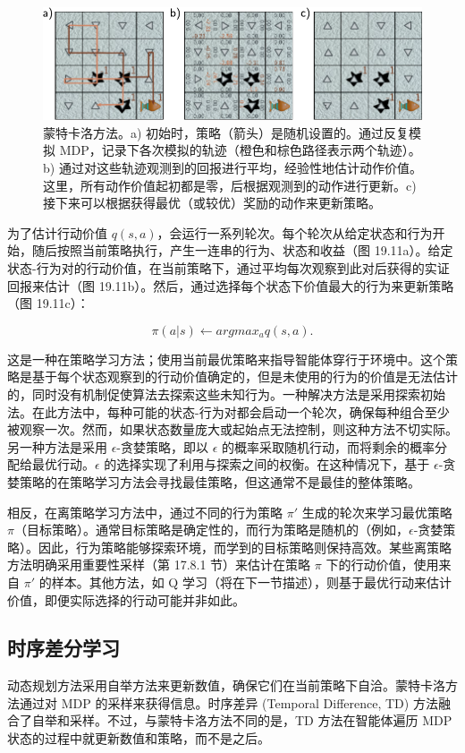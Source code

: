 \documentclass[lang=cn,newtx,10pt,scheme=chinese]{elegantbook}
\begin{document}
\begin{figure}[ht!]
\centering
\includegraphics[width=0.7\linewidth]{PDFFigures/UDLChap19PDF/ReinforceMC.pdf}
\caption{蒙特卡洛方法。a) 初始时，策略（箭头）是随机设置的。通过反复模拟 MDP，记录下各次模拟的轨迹（橙色和棕色路径表示两个轨迹）。b) 通过对这些轨迹观测到的回报进行平均，经验性地估计动作价值。这里，所有动作价值起初都是零，后根据观测到的动作进行更新。c) 接下来可以根据获得最优（或较优）奖励的动作来更新策略。}
\end{figure}

为了估计行动价值 \(q(s, a)\)，会运行一系列轮次。每个轮次从给定状态和行为开始，随后按照当前策略执行，产生一连串的行为、状态和收益（图 19.11a）。给定状态-行为对的行动价值，在当前策略下，通过平均每次观察到此对后获得的实证回报来估计（图 19.11b）。然后，通过选择每个状态下价值最大的行为来更新策略（图 19.11c）：

\begin{equation}
\pi(a|s) \leftarrow argmax_a q(s, a). 
\end{equation}

这是一种在策略学习方法；使用当前最优策略来指导智能体穿行于环境中。这个策略是基于每个状态观察到的行动价值确定的，但是未使用的行为的价值是无法估计的，同时没有机制促使算法去探索这些未知行为。一种解决方法是采用探索初始法。在此方法中，每种可能的状态-行为对都会启动一个轮次，确保每种组合至少被观察一次。然而，如果状态数量庞大或起始点无法控制，则这种方法不切实际。另一种方法是采用 \(\epsilon\)-贪婪策略，即以 \(\epsilon\) 的概率采取随机行动，而将剩余的概率分配给最优行动。\(\epsilon\) 的选择实现了利用与探索之间的权衡。在这种情况下，基于 \(\epsilon\)-贪婪策略的在策略学习方法会寻找最佳策略，但这通常不是最佳的整体策略。

相反，在离策略学习方法中，通过不同的行为策略 \(\pi \prime\) 生成的轮次来学习最优策略 \(\pi\)（目标策略）。通常目标策略是确定性的，而行为策略是随机的（例如，\(\epsilon\)-贪婪策略）。因此，行为策略能够探索环境，而学到的目标策略则保持高效。某些离策略方法明确采用重要性采样（第 17.8.1 节）来估计在策略 \(\pi\) 下的行动价值，使用来自 \(\pi \prime\) 的样本。其他方法，如 Q 学习（将在下一节描述），则基于最优行动来估计价值，即便实际选择的行动可能并非如此。

\subsection{时序差分学习}
动态规划方法采用自举方法来更新数值，确保它们在当前策略下自洽。蒙特卡洛方法通过对 MDP 的采样来获得信息。时序差异 (Temporal Difference, TD) 方法融合了自举和采样。不过，与蒙特卡洛方法不同的是，TD 方法在智能体遍历 MDP 状态的过程中就更新数值和策略，而不是之后。
\end{document}
